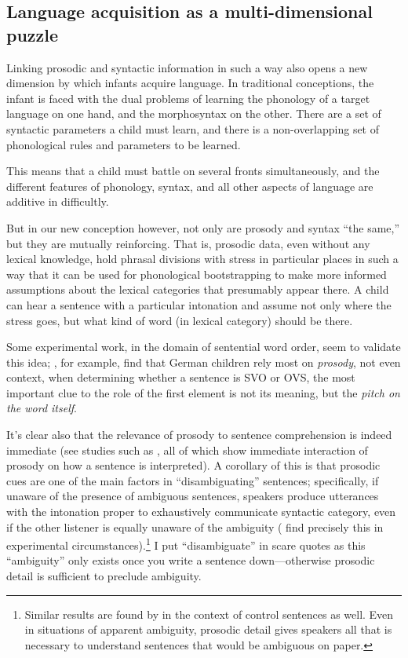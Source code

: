 \documentclass{article}
\begin{document}
\subsection{Language acquisition as a multi-dimensional puzzle}

Linking prosodic and syntactic information in such a way also opens a new dimension by which infants acquire language.
In traditional conceptions, the infant is faced with the dual problems of learning the phonology of a target language on one hand, and the morphosyntax on the other.
There are a set of syntactic parameters a child must learn, and there is a non-overlapping set of phonological rules and parameters to be learned.

This means that a child must battle on several fronts simultaneously, and the different features of phonology, syntax, and all other aspects of language are additive in difficultly.

But in our new conception however, not only are prosody and syntax ``the same,'' but they are mutually reinforcing.
That is, prosodic data, even without any lexical knowledge, hold phrasal divisions with stress in particular places in such a way that it can be used for phonological bootstrapping to make more informed assumptions about the lexical categories that presumably appear there.
A child can hear a sentence with a particular intonation and assume not only where the stress goes, but what kind of word (in lexical category) should be there.

Some experimental work, in the domain of sentential word order, seem to validate this idea; \textcite{grunloh11}, for example, find that German children rely most on \emph{prosody}, not even context, when determining whether a sentence is SVO or OVS, the most important clue to the role of the first element is not its meaning, but the \emph{pitch on the word itself}.

It's clear also that the relevance of prosody to sentence comprehension is indeed immediate (see studies such as \textcite{eckstein06,kerkhofs07,sammler10}, all of which show immediate interaction of prosody on how a sentence is interpreted).
A corollary of this is that prosodic cues are one of the main factors in ``disambiguating'' sentences; specifically, if unaware of the presence of ambiguous sentences, speakers produce utterances with the intonation proper to exhaustively communicate syntactic category, even if the other listener is equally unaware of the ambiguity (\textcite{millotte07} find precisely this in experimental circumstances).\footnote{Similar results are found by \textcite{bogels09} in the context of control sentences as well. Even in situations of apparent ambiguity, prosodic detail gives speakers all that is necessary to understand sentences that would be ambiguous on paper.}
I put ``disambiguate'' in scare quotes as this ``ambiguity'' only exists once you write a sentence down---otherwise prosodic detail is sufficient to preclude ambiguity.
\end{document}

